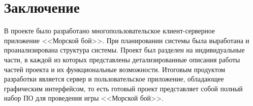﻿\section{Заключение}
В проекте было разработано многопользовательское клиент-серверное приложение <<Морской бой>>. При планировании системы была выработана и проанализирована структура системы. Проект был разделен на индивидуальные части, в каждой из которых представлены детализированные описания работы частей проекта и их функциональные возможности. Итоговым продуктом разработки является сервер и пользовательское приложение, обладающее графическим интерфейсом, то есть готовый проект представляет собой полный набор ПО для проведения игры <<Морской бой>>.
\endinput
